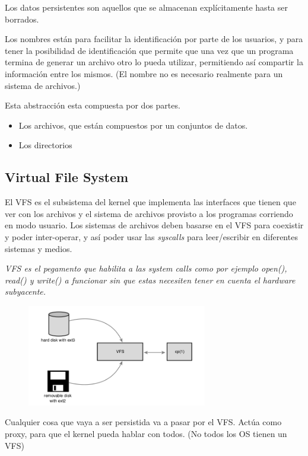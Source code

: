 \documentclass[titlepage,a4paper]{article}
\begin{document}
Los datos persistentes son aquellos que se almacenan explícitamente hasta ser borrados.

Los nombres están para facilitar la identificación por parte de los usuarios, y para tener la posibilidad de identificación que permite que una vez que un programa termina de generar un archivo otro lo pueda utilizar, permitiendo así compartir la información entre los mismos. (El nombre no es necesario realmente para un sistema de archivos.)

Esta abstracción esta compuesta por dos partes.
\begin{itemize}
    \item Los archivos, que están compuestos por un conjuntos de datos.
    \item Los directorios
\end{itemize}

\subsection*{Virtual File System}

El VFS es el subsistema del kernel que implementa las interfaces que tienen que ver con los archivos y el sistema de archivos provisto a los programas corriendo en modo usuario. Los sistemas de archivos deben basarse en el VFS para coexistir y poder inter-operar, y así poder usar las \emph{syscalls} para leer/escribir en diferentes sistemas y medios.

\textit{VFS es el pegamento que habilita a las system calls como por ejemplo open(), read() y write() a funcionar sin que estas necesiten tener en cuenta el hardware subyacente.}

\begin{figure}[!htb]
    \centering
    \includegraphics[width=0.7\textwidth]{ImagenesApunte/vfs.png}
\end{figure}

Cualquier cosa que vaya a ser persistida va a pasar por el VFS. Actúa como proxy, para que el kernel pueda hablar con todos. (No todos los OS tienen un VFS)
\end{document}
